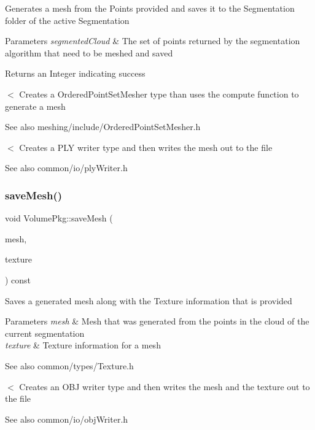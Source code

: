 Generates a mesh from the Points provided and saves it to the Segmentation folder of the active Segmentation 
\begin{DoxyParams}{Parameters}
{\em segmented\+Cloud} & The set of points returned by the segmentation algorithm that need to be meshed and saved \\
\hline
\end{DoxyParams}
\begin{DoxyReturn}{Returns}
an Integer indicating success 
\end{DoxyReturn}
$<$ Creates a Ordered\+Point\+Set\+Mesher type than uses the compute function to generate a mesh \begin{DoxySeeAlso}{See also}
meshing/include/\+Ordered\+Point\+Set\+Mesher.\+h
\end{DoxySeeAlso}
$<$ Creates a P\+LY writer type and then writes the mesh out to the file \begin{DoxySeeAlso}{See also}
common/io/ply\+Writer.\+h 
\end{DoxySeeAlso}
\hypertarget{classVolumePkg_acd9f9d44b478d8d828de4f364983a5f0}{}\label{classVolumePkg_acd9f9d44b478d8d828de4f364983a5f0} 
\subsubsection{\texorpdfstring{save\+Mesh()}{saveMesh()}\hspace{0.1cm}{\footnotesize\ttfamily [2/2]}}
{\footnotesize\ttfamily void Volume\+Pkg\+::save\+Mesh (\begin{DoxyParamCaption}\item[{const volcart\+::\+I\+T\+K\+Mesh\+::\+Pointer}]{mesh,  }\item[{const volcart\+::\+Texture \&}]{texture }\end{DoxyParamCaption}) const}

Saves a generated mesh along with the Texture information that is provided 
\begin{DoxyParams}{Parameters}
{\em mesh} & Mesh that was generated from the points in the cloud of the current segmentation \\
\hline
{\em texture} & Texture information for a mesh \\
\hline
\end{DoxyParams}
\begin{DoxySeeAlso}{See also}
common/types/\+Texture.\+h 
\end{DoxySeeAlso}
$<$ Creates an O\+BJ writer type and then writes the mesh and the texture out to the file \begin{DoxySeeAlso}{See also}
common/io/obj\+Writer.\+h 
\end{DoxySeeAlso}
\hypertarget{classVolumePkg_abdccc4c348d57a7ea84a65c48ee50c75}{}\label{classVolumePkg_abdccc4c348d57a7ea84a65c48ee50c75} 
